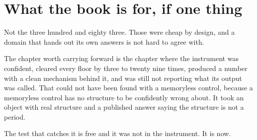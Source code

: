 \section{What the book is for, if one thing}

Not the three hundred and eighty three. Those were cheap by design, and a domain that hands out its
own answers is not hard to agree with.

The chapter worth carrying forward is the chapter where the instrument was confident, cleared every
floor by three to twenty nine times, produced a number with a clean mechanism behind it, and was
still not reporting what its output was called. That could not have been found with a memoryless
control, because a memoryless control has no structure to be confidently wrong about. It took an
object with real structure and a published answer saying the structure is not a period.

The test that catches it is free and it was not in the instrument. It is now.
